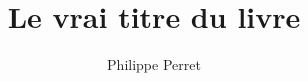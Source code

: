 \documentclass[11pt,french,twoside,a5paper]{book}
\title{Le vrai titre du livre}
\author{Philippe Perret}
\begin{document}
\maketitle

\tableofcontents

\renewcommand{\bibname}{Filmographie}

\printindex
\end{document}

